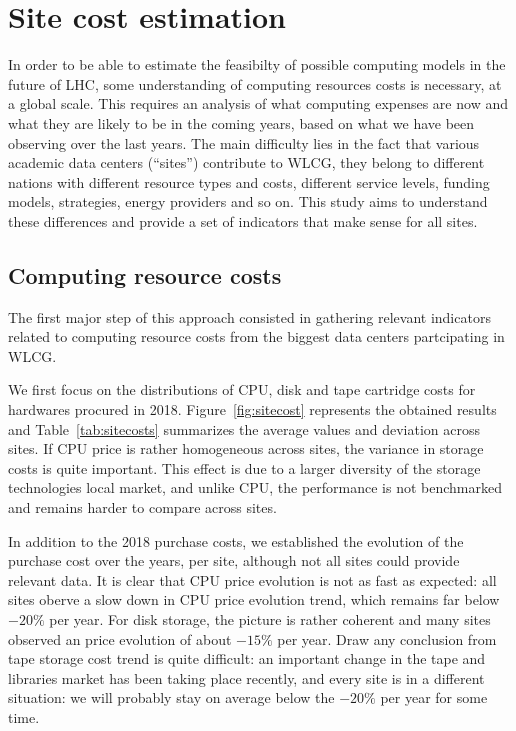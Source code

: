 \section{Site cost estimation}

In order to be able to estimate the feasibilty of possible computing models in the future of LHC, some understanding
of computing resources costs is necessary, at a global scale.
This requires an analysis of what computing expenses are now and what they are likely to be in the coming years, based on
what we have been observing over the last years.
The main difficulty lies in the fact that various academic data centers (``sites'') contribute to WLCG, they belong
to different nations with different resource types and costs, different service levels, funding models,
strategies, energy providers and so on. This study aims to understand these differences and provide a set of indicators
that make sense for all sites.


\subsection{\label{sec:sitecost:computing}Computing resource costs}

The first major step of this approach consisted in gathering relevant indicators related to computing resource costs
from the biggest data centers partcipating in WLCG.

We first focus on the distributions of CPU, disk and tape cartridge costs for hardwares procured in 2018.
Figure~\ref{fig:sitecost} represents the obtained results and Table~\ref{tab:sitecosts} summarizes the average values
and deviation across sites. If CPU price is rather homogeneous across sites, the variance
in storage costs is quite important. This effect is due to a larger diversity of the storage technologies local market,
and unlike CPU, the performance is not benchmarked and remains harder to compare across sites.

In addition to the 2018 purchase costs, we established the evolution of the purchase cost over the years, per site,
although not all sites could provide relevant data. It is clear that CPU price evolution is not as fast as expected: all
sites oberve a slow down in CPU price evolution trend, which remains far below $-20 \%$ per year.
For disk storage, the picture is rather coherent and many sites
observed an price evolution of about $-15 \%$ per year.
Draw any conclusion from tape storage cost trend is quite difficult:
an important change in the tape and libraries market has been taking place recently, and every site is in a different
situation: we will probably stay on average below the $-20 \%$ per year for some time.



